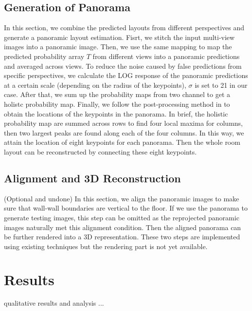 \subsection{Generation of Panorama}
\label{sec:merging}
In this section, we combine the predicted layouts from different perspectives and generate a panoramic layout estimation. Fisrt, we stitch the input multi-view images into a panoramic image. Then, we use the same mapping to map the predicted probability array $T$ from different views into a panoramic predictions and averaged across views. To reduce the noise caused by false predictions from specific perspectives, we calculate the LOG response of the panoramic predictions at a certain scale (depending on the radius of the keypoints), $\sigma$ is set to 21 in our case. After that, we sum up the probability maps from two channel to get a holistc probability map. Finally, we follow the post-processing method in \cite{LayoutNet} to obtain the locations of the keypoints in the panorama. In brief, the holistic probability map are summed across rows to find four local maxima for columns, then two largest peaks are found along each of the four columns. In this way, we attain the location of eight keypoints for each panorama. Then the whole room layout can be reconstructed by connecting these eight keypoints.


\subsection{Alignment and 3D Reconstruction}
\label{sec:align}

(Optional and undone) In this section, we align the panoramic images to make sure that wall-wall boundaries are vertical to the floor. If we use the panorama to generate testing images, this step can be omitted as the reprojected panoramic images naturally met this alignment condition. Then the aligned panorama can be further rendered into a 3D representation. These two steps are implemented using existing techniques but the rendering part is not yet available. 


\section{Results}
qualitative results and analysis ...

